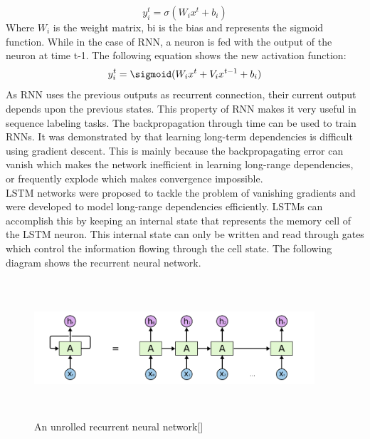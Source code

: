 \documentclass[12pt,a4paper]{article}
\begin{document}
    \begin{equation}
        y^t_i = \sigma(W_i x^t + b_i)
    \end{equation}
Where $W_i$ is the weight matrix, bi is the bias and represents the sigmoid function. While in the case of RNN, a neuron is fed with the output of the neuron at time t-1.  The following equation shows the new activation function:
    \begin{equation}
        y_i^t = \sigmoid(W_i x^t + V_i x^{t-1} + b_i)
    \end{equation}
As  RNN uses the previous outputs as recurrent connection, their current output depends upon the previous states.  This property of RNN makes it very useful in sequence labeling tasks. The backpropagation through time can be used to train RNNs. It was demonstrated by that learning long-term dependencies is difficult using gradient descent. This is mainly because the backpropagating error can vanish which makes the network inefficient in learning long-range dependencies, or frequently explode which makes convergence impossible.\\
LSTM networks were proposed to tackle the problem of vanishing gradients and were developed to model long-range dependencies efficiently. LSTMs can accomplish this by keeping an internal state that represents the memory cell of the LSTM neuron. This internal state can only be written and read through gates which control the information flowing through the cell state.  The following diagram shows the recurrent neural network.
\begin{figure}[h]
    \centering
    \includegraphics[width=4.1in,height=2in]{rnn.png}
    \caption{An unrolled recurrent neural network[]}
    \label{fig:rnn}
\end{figure}
\end{document}
